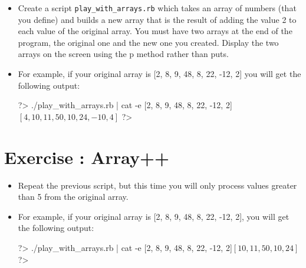 \documentclass{42-en}
\begin{document}
\exnumber{\exercicenumber}


\begin{itemize}

\item Create a script \texttt{play\_with\_arrays.rb} which takes an array of numbers (that you define) and builds a new array that is the result of adding the value 2 to each value of the original array. You must have two arrays at the end of the program, the original one and the new one you created. Display the two arrays on the screen using the p method rather than puts.

\item For example, if your original array is [2, 8, 9, 48, 8, 22, -12, 2] you will get the following output:
\begin{42console}
	?> ./play_with_arrays.rb | cat -e
	[2, 8, 9, 48, 8, 22, -12, 2]$
	[4, 10, 11, 50, 10, 24, -10, 4]$
	?>
\end{42console}

\end{itemize}



\chapter{Exercise \exercicenumber: Array++}

\exnumber{\exercicenumber}


\begin{itemize}

\item Repeat the previous script, but this time you will only process values greater than 5 from the original array.

\item For example, if your original array is [2, 8, 9, 48, 8, 22, -12, 2], you will get the following output: 
\begin{42console}
	?> ./play_with_arrays.rb | cat -e
	[2, 8, 9, 48, 8, 22, -12, 2]$
	[10, 11, 50, 10, 24]$
	?>
\end{42console}

\end{itemize}
\end{document}
